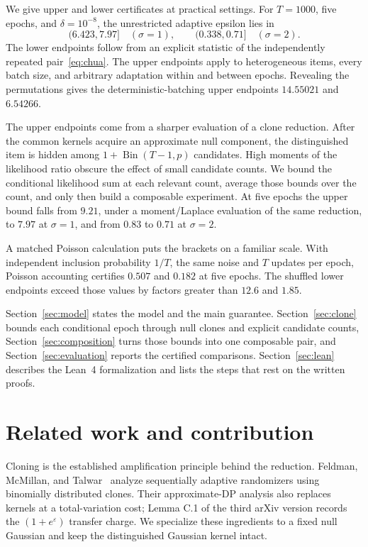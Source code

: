 \documentclass[conference]{IEEEtran}
\newcommand{\Bin}{\operatorname{Bin}}
\newcommand{\eps}{\varepsilon}
\begin{document}
We give upper and lower certificates at practical settings. For $T=1000$, five epochs, and $\delta=10^{-8}$, the unrestricted adaptive epsilon lies in
\begin{equation}\label{eq:brackets}
 (6.423,7.97]\quad(\sigma=1),\qquad
 (0.338,0.71]\quad(\sigma=2).
\end{equation}
The lower endpoints follow from an explicit statistic of the independently repeated pair~\eqref{eq:chua}. The upper endpoints apply to heterogeneous items, every batch size, and arbitrary adaptation within and between epochs. Revealing the permutations gives the deterministic-batching upper endpoints $14.55021$ and $6.54266$.

The upper endpoints come from a sharper evaluation of a clone reduction. After the common kernels acquire an approximate null component, the distinguished item is hidden among $1+\Bin(T-1,p)$ candidates. High moments of the likelihood ratio obscure the effect of small candidate counts. We bound the conditional likelihood sum at each relevant count, average those bounds over the count, and only then build a composable experiment. At five epochs the upper bound falls from $9.21$, under a moment/Laplace evaluation of the same reduction, to $7.97$ at $\sigma=1$, and from $0.83$ to $0.71$ at $\sigma=2$.

A matched Poisson calculation puts the brackets on a familiar scale. With independent inclusion probability $1/T$, the same noise and $T$ updates per epoch, Poisson accounting certifies $0.507$ and $0.182$ at five epochs. The shuffled lower endpoints exceed those values by factors greater than $12.6$ and $1.85$.

Section~\ref{sec:model} states the model and the main guarantee. Section~\ref{sec:clone} bounds each conditional epoch through null clones and explicit candidate counts, Section~\ref{sec:composition} turns those bounds into one composable pair, and Section~\ref{sec:evaluation} reports the certified comparisons. Section~\ref{sec:lean} describes the Lean~4 formalization and lists the steps that rest on the written proofs.

\section{Related work and contribution}
Cloning is the established amplification principle behind the reduction. Feldman, McMillan, and Talwar~\cite{fmt} analyze sequentially adaptive randomizers using binomially distributed clones. Their approximate-DP analysis also replaces kernels at a total-variation cost; Lemma C.1 of the third arXiv version records the $(1+e^\eps)$ transfer charge. We specialize these ingredients to a fixed null Gaussian and keep the distinguished Gaussian kernel intact.
\end{document}
